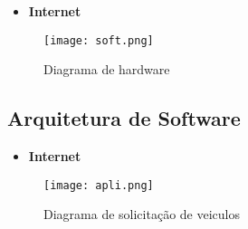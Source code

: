     \begin{itemize}

        \item \textbf{Internet}
        \end{itemize}
        \begin{figure}[H]
             \begin{center}
                 \caption{Diagrama de hardware} \label{afp}
                 \texttt{[image: soft.png]} \\

             \end{center}
            \end{figure}


\subsection{Arquitetura de Software}

\begin{itemize}

    \item \textbf{Internet}
    \end{itemize}
    \begin{figure}[H]
         \begin{center}
             \caption{Diagrama de solicitação de veiculos} \label{afp}
             \texttt{[image: apli.png]} \\

         \end{center}
        \end{figure}
